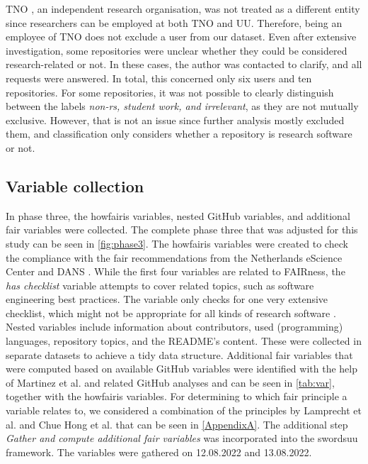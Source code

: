 TNO \cite{tno_about}, an independent research organisation, was not treated as a different entity since researchers can be employed at both TNO and UU. Therefore, being an employee of TNO does not exclude a user from our dataset. Even after extensive investigation, some repositories were unclear whether they could be considered research-related or not. In these cases, the author was contacted to clarify, and all requests were answered. In total, this concerned only six users and ten repositories.
For some repositories, it was not possible to clearly distinguish between the labels \textit{non-rs, student work, and irrelevant}, as they are not mutually exclusive. However, that is not an issue since further analysis mostly excluded them, and classification only considers whether a repository is research software or not.



 

\subsection{Variable collection}
In phase three, the howfairis variables, nested GitHub variables, and additional \acrshort{fair} variables were collected. The complete phase three that was adjusted for this study can be seen in \autoref{fig:phase3}.
The howfairis variables were created to check the compliance with the \acrshort{fair} recommendations from the Netherlands eScience Center and DANS \cite{noauthor_fair_nodate}. While the first four variables are related to FAIRness, the \textit{has checklist} variable attempts to cover related topics, such as software engineering best practices. The variable only checks for one very extensive checklist, which might not be appropriate for all kinds of research software \cite{noauthor_badgeapp_nodate}.
Nested variables include information about contributors, used (programming) languages, repository topics, and the README's content. These were collected in separate datasets to achieve a tidy data structure. 
Additional \acrshort{fair} variables that were computed based on available GitHub variables were identified with the help of Martinez et al. \cite{martinez_survey_2022, Spaaks_howfairis} and related GitHub analyses \cite{hasselbring_open_2020, russell_large-scale_2018, pico_fairsoft_2022} and can be seen in \autoref{tab:var}, together with the howfairis variables. For determining to which \acrshort{fair} principle a variable relates to, we considered a combination of the principles by Lamprecht et al. \cite{lamprecht_towards_2020} and Chue Hong et al. \cite{chue_hong_fair_2022} that can be seen in \autoref{AppendixA}. The additional step \textit{Gather and compute additional \acrshort{fair} variables} was incorporated into the \acrshort{swordsuu} framework. The variables were gathered on 12.08.2022 and 13.08.2022.

